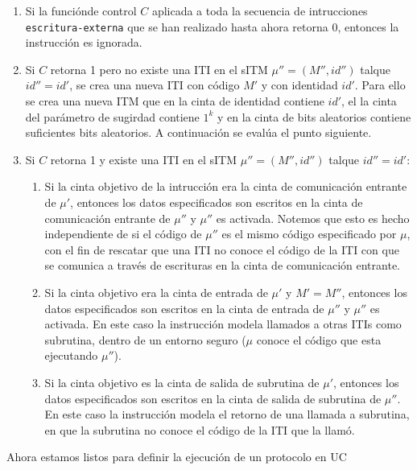 \begin{enumerate}
    \item Si la funciónde control $C$ aplicada a toda la secuencia de intrucciones \texttt{escritura-externa}
          que se han realizado hasta ahora retorna 0, entonces la instrucción es ignorada.
    \item Si $C$ retorna 1 pero no existe una ITI en el sITM $\mu'' = (M'', id'')$ talque $id''=id'$, se
          crea una nueva ITI con código $M'$ y con identidad $id'$. Para ello se crea una nueva ITM
          que en la cinta de identidad contiene $id'$, el la cinta del parámetro de sugirdad contiene $1^k$
          y en la cinta de bits aleatorios contiene suficientes bits aleatorios. A continuación se evalúa
          el punto siguiente.
    \item Si $C$ retorna 1 y existe una ITI en el sITM $\mu'' = (M'', id'')$ talque $id''=id'$:
    \begin{enumerate}
        \item Si la cinta objetivo de la intrucción era la cinta de comunicación entrante de $\mu'$, entonces
              los datos especificados son escritos en la cinta de comunicación entrante de $\mu''$ y $\mu''$
              es activada. Notemos que esto es hecho independiente de si el código de $\mu''$ es el mismo
              código especificado por $\mu$, con el fin de rescatar que una ITI no conoce el código de la
              ITI con que se comunica a través de escrituras en la cinta de comunicación entrante.
        \item Si la cinta objetivo era la cinta de entrada de $\mu'$ y $M' = M''$, entonces los datos
              especificados son escritos en la cinta de entrada de $\mu''$ y $\mu''$ es activada. En este caso
              la instrucción modela llamados a otras ITIs como subrutina, dentro de un entorno seguro ($\mu$
              conoce el código que esta ejecutando $\mu''$).
        \item Si la cinta objetivo es la cinta de salida de subrutina de $\mu'$, entonces los datos
              especificados son escritos en la cinta de salida de subrutina de $\mu''$. En este caso la
              instrucción modela el retorno de una llamada a subrutina, en que la subrutina no conoce
              el código de la ITI que la llamó.
    \end{enumerate}
\end{enumerate}

Ahora estamos listos para definir la ejecución de un protocolo en UC

